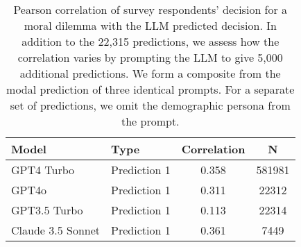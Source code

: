 \begin{table}[!h]
\centering
\caption{\label{tab:corr-tab}Pearson correlation of survey respondents' decision for a moral dilemma with the LLM predicted decision. In addition to the 22,315 predictions, we assess how the correlation varies by prompting the LLM to give 5,000 additional predictions. We form a composite from the modal prediction of three identical prompts. For a separate set of predictions, we omit the demographic persona from the prompt.}
\centering
\begin{tabular}[t]{llcc}
\toprule
Model & Type & Correlation & N\\
\midrule
GPT4 Turbo & Prediction 1 & 0.358 & 581981\\
\cmidrule{1-4}
GPT4o & Prediction 1 & 0.311 & 22312\\
\cmidrule{1-4}
GPT3.5 Turbo & Prediction 1 & 0.113 & 22314\\
\cmidrule{1-4}
Claude 3.5 Sonnet & Prediction 1 & 0.361 & 7449\\
\bottomrule
\end{tabular}
\end{table}
